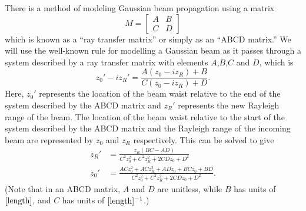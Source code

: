 
There is a method of modeling Gaussian beam propagation using a matrix
\begin{equation}
M=\begin{bmatrix}A&B \\C&D\end{bmatrix}
\end{equation}
which is known as a ``ray transfer matrix'' or simply as an ``ABCD matrix.'' We will use the well-known rule \cite{BYUOpticsBook}\cite{lasersMilonniEberly} for modelling a Gaussian beam as it passes through a system described by a ray transfer matrix with elements $A$,$B$,$C$ and $D$, which is 
\begin{equation} \label{ABCDlawforGaussianBeams}
z_0'-iz_R'=\frac{A(z_0-iz_R)+B}{C(z_0-iz_R)+D}.
\end{equation}
Here, $z_0'$ represents the location of the beam waist relative to the end of the system described by the ABCD matrix and $z_R'$ represents the new Rayleigh range of the beam. The location of the beam waist relative to the start of the system described by the ABCD matrix and the Rayleigh range of the incoming beam are represented by $z_0$ and $z_R$ respectively.
This can be solved to give 
\begin{align}
z_R' &= \frac{ z_R (BC-AD)}{C^2z_0^2+C^2z_R^2+2 C D z_0 + D^2} \\
z_0' &=\frac{AC z_0^2+ACz_R^2+ADz_0+BCz_0+BD}{C^2z_0^2+C^2z_R^2+2 C D z_0 + D^2}.
\end{align}
(Note that in an ABCD matrix, $A$ and $D$ are unitless, while $B$ has units of $[\textnormal{length}]$, and $C$ has units of $[\textnormal{length}]^{-1}$.)


